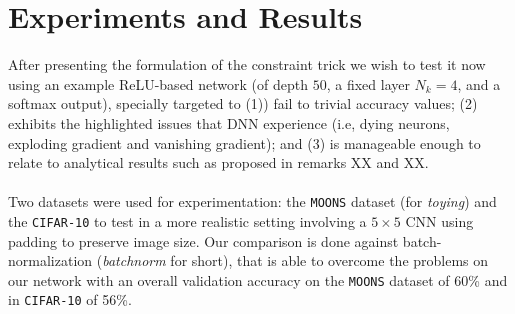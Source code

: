 \section{Experiments and Results}\label{sec:experiments}

After presenting the formulation of the constraint trick we wish to test it now using an example ReLU-based network (of depth $50$, a fixed layer $N_k=4$, and a softmax output), specially targeted to (1)) fail to trivial accuracy values; (2) exhibits the highlighted issues that DNN experience (i.e, dying neurons, exploding gradient and vanishing gradient); and (3) is manageable enough to relate to analytical results such as proposed in remarks XX and XX. 
\\\\
Two datasets were used for experimentation: the \texttt{MOONS} dataset (for \emph{toying}) and the \texttt{CIFAR-10} to test in a more realistic setting involving a $5\times 5$ CNN using padding to preserve image size. Our comparison is done against batch-normalization (\emph{batchnorm} for short), that is able to overcome the problems on our network with an overall validation accuracy on the \texttt{MOONS} dataset of 60\% and in \texttt{CIFAR-10} of 56\%.  


